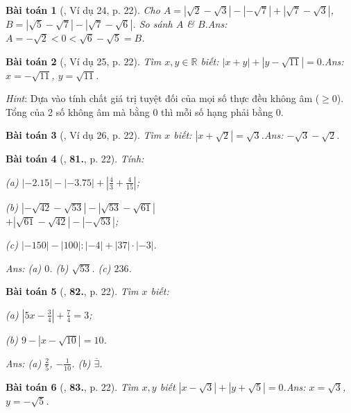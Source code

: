 \documentclass{article}
\numberwithin{equation}{section}
\newtheorem{baitoan}{Bài toán}
\begin{document}
\begin{baitoan}[\cite{Tuyen_Toan_7}, Ví dụ 24, p. 22]
	Cho $A = |\sqrt{2} - \sqrt{3}| - |-\sqrt{7}| + |\sqrt{7} - \sqrt{3}|$, $B = |\sqrt{5} - \sqrt{7}| - |\sqrt{7} - \sqrt{6}|$. So sánh $A$ \& $B$.\hfill{\sf Ans:} $A = -\sqrt{2} < 0 < \sqrt{6} - \sqrt{5} = B$.
\end{baitoan}	

\begin{baitoan}[\cite{Tuyen_Toan_7}, Ví dụ 25, p. 22]
	Tìm $x,y\in\mathbb{R}$ biết: $|x + y| + |y - \sqrt{11}| = 0$.\hfill{\sf Ans:} $x = -\sqrt{11}$, $y = \sqrt{11}$.
\end{baitoan}
\noindent\textit{Hint}: Dựa vào tính chất giá trị tuyệt đối của mọi số thực đều không âm ($\ge 0$). Tổng của 2 số không âm mà bằng $0$ thì mỗi số hạng phải bằng $0$.

\begin{baitoan}[\cite{Tuyen_Toan_7}, Ví dụ 26, p. 22]
	Tìm $x$ biết: $|x + \sqrt{2}| = \sqrt{3}$.\hfill{\sf Ans:} $-\sqrt{3} - \sqrt{2}$.
\end{baitoan}

\begin{baitoan}[\cite{Tuyen_Toan_7}, \textbf{81.}, p. 22]
	Tính:
	\begin{enumerate*}
		\item[(a)] $|-2.15| - |-3.75| + \left|\frac{4}{3} + \frac{4}{15}\right|$;
		\item[(b)] $|-\sqrt{42} - \sqrt{53}| - |\sqrt{53} - \sqrt{61}|$\\$+ |\sqrt{61} - \sqrt{42}| - |-\sqrt{53}|$;
		\item[(c)] $|-150| - |100|:|-4| + |37|\cdot|-3|$.
	\end{enumerate*}\hfill{\sf Ans:} (a) $0$. (b) $\sqrt{53}$. (c) $236$.
\end{baitoan}

\begin{baitoan}[\cite{Tuyen_Toan_7}, \textbf{82.}, p. 22]
	Tìm $x$ biết:
	\begin{enumerate*}
		\item[(a)] $\left|5x - \frac{3}{4}\right| + \frac{7}{4} = 3$;
		\item[(b)] $9 - |x - \sqrt{10}| = 10$.
	\end{enumerate*}\hfill{\sf Ans:} (a) $\frac{2}{5}$, $-\frac{1}{10}$. (b) $\overline{\exists}$.
\end{baitoan}

\begin{baitoan}[\cite{Tuyen_Toan_7}, \textbf{83.}, p. 22]
	Tìm $x,y$ biết $|x - \sqrt{3}| + |y + \sqrt{5}| = 0$.\hfill{\sf Ans:} $x = \sqrt{3}$, $y = -\sqrt{5}$.
\end{baitoan}
\end{document}
